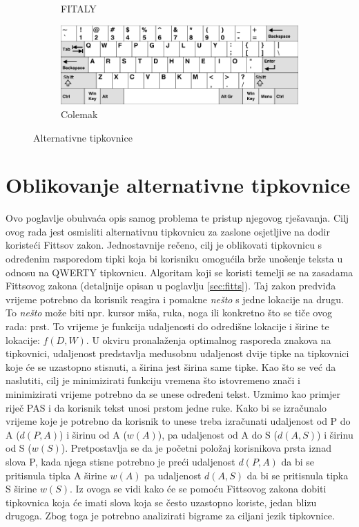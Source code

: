 \documentclass[times, utf8, zavrsni, numeric]{fer}
\begin{document}
\begin{figure}[htb]
\begin{subfigure}[b]{0.45\textwidth}
    \caption{FITALY}
    \label{fig:fitaly}
  \end{subfigure}
  \hfill
  \begin{subfigure}[b]{0.45\textwidth}
    \includegraphics[width=\textwidth]{img/colemak.png}
    \caption{Colemak}
    \label{fig:colemak}
  \end{subfigure}
  \caption{Alternativne tipkovnice}
\end{figure}

\chapter{Oblikovanje alternativne tipkovnice}
Ovo poglavlje obuhvaća opis samog problema te pristup njegovog rješavanja. Cilj ovog rada jest osmisliti alternativnu tipkovnicu za zaslone osjetljive na dodir koristeći Fittsov zakon. Jednostavnije rečeno, cilj je oblikovati tipkovnicu s određenim rasporedom tipki koja bi korisniku omogućila brže unošenje teksta u odnosu na QWERTY tipkovnicu. Algoritam koji se koristi temelji se na zasadama Fittsovog zakona (detaljnije opisan u poglavlju \ref{sec:fitts}). Taj zakon predviđa vrijeme potrebno da korisnik reagira i pomakne \emph{nešto} s jedne lokacije na drugu. To \emph{nešto} može biti npr. kursor miša, ruka, noga ili konkretno što se tiče ovog rada: prst. To vrijeme je funkcija udaljenosti do odredišne lokacije i širine te lokacije: $f(D,W)$. U okviru pronalaženja optimalnog rasporeda znakova na tipkovnici, udaljenost predstavlja međusobnu udaljenost dvije tipke na tipkovnici koje će se uzastopno stisnuti, a širina jest širina same tipke. Kao što se već da naslutiti, cilj je minimizirati funkciju vremena što istovremeno znači i minimizirati vrijeme potrebno da se unese određeni tekst. Uzmimo kao primjer riječ PAS i da korisnik tekst unosi prstom jedne ruke. Kako bi se izračunalo vrijeme koje je potrebno da korisnik to unese treba izračunati udaljenost od P do A ($d(P,A)$) i širinu od A ($w(A)$), pa udaljenost od A do S ($d(A,S)$) i širinu od S ($w(S)$). Pretpostavlja se da je početni položaj korisnikova prsta iznad slova P, kada njega stisne potrebno je preći udaljenost $d(P,A)$ da bi se pritisnula tipka A širine $w(A)$ pa udaljenost $d(A,S)$ da bi se pritisnula tipka S širine $w(S)$. Iz ovoga se vidi kako će se pomoću Fittsovog zakona dobiti tipkovnica koja će imati slova koja se često uzastopno koriste, jedan blizu drugoga. Zbog toga je potrebno analizirati bigrame za ciljani jezik tipkovnice.
\end{document}
